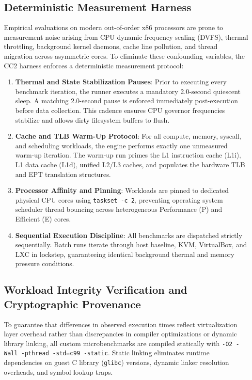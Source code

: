 \subsection{Deterministic Measurement Harness}
\label{subsec:deterministic_harness}

Empirical evaluations on modern out-of-order x86 processors are prone to measurement noise arising from CPU dynamic frequency scaling (DVFS), thermal throttling, background kernel daemons, cache line pollution, and thread migration across asymmetric cores. To eliminate these confounding variables, the CC2 harness enforces a deterministic measurement protocol:

\begin{enumerate}
    \item \textbf{Thermal and State Stabilization Pauses}: Prior to executing every benchmark iteration, the runner executes a mandatory 2.0-second quiescent sleep. A matching 2.0-second pause is enforced immediately post-execution before data collection. This cadence ensures CPU governor frequencies stabilize and allows dirty filesystem buffers to flush.
    \item \textbf{Cache and TLB Warm-Up Protocol}: For all compute, memory, syscall, and scheduling workloads, the engine performs exactly one unmeasured warm-up iteration. The warm-up run primes the L1 instruction cache (L1i), L1 data cache (L1d), unified L2/L3 caches, and populates the hardware TLB and EPT translation structures.
    \item \textbf{Processor Affinity and Pinning}: Workloads are pinned to dedicated physical CPU cores using \texttt{taskset -c 2}, preventing operating system scheduler thread bouncing across heterogeneous Performance (P) and Efficient (E) cores.
    \item \textbf{Sequential Execution Discipline}: All benchmarks are dispatched strictly sequentially. Batch runs iterate through host baseline, KVM, VirtualBox, and LXC in lockstep, guaranteeing identical background thermal and memory pressure conditions.
\end{enumerate}

\subsection{Workload Integrity Verification and Cryptographic Provenance}
\label{subsec:cryptographic_provenance}

To guarantee that differences in observed execution times reflect virtualization layer overhead rather than discrepancies in compiler optimizations or dynamic library linking, all custom microbenchmarks are compiled statically with \texttt{-O2 -Wall -pthread -std=c99 -static}. Static linking eliminates runtime dependencies on guest C library (\texttt{glibc}) versions, dynamic linker resolution overheads, and symbol lookup traps.

